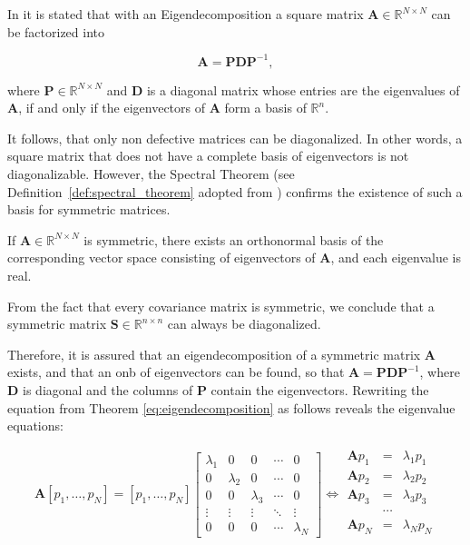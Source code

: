 \documentclass[../../../main.tex]{subfiles}
\begin{document}
In \cite[99]{dei_2020} it is stated that with an Eigendecomposition a square matrix $\bm{A} \in \mathbb{R}^{N \times N}$ can be factorized into

\begin{equation}\label{eq:eigendecomposition}
    \bm{A} = \bm{P}\bm{D}\bm{P}^{-1},
\end{equation}

where $\bm{P} \in \mathbb{R}^{N \times N}$ and $\bm{D}$ is a diagonal matrix whose entries are the eigenvalues of $\bm{A}$, if and only if the eigenvectors of $\bm{A}$ form a basis of $\mathbb{R}^n$.

It follows, that only non defective matrices can be diagonalized. In other words, a square matrix that does not have a complete basis of eigenvectors is not diagonalizable. However, the Spectral Theorem (see Definition~\ref{def:spectral_theorem} adopted from \cite[94]{dei_2020}) confirms the existence of such a basis for symmetric matrices.

\begin{definition}\label{def:spectral_theorem}
If $\bm{A} \in \mathbb{R}^{N \times N}$ is symmetric, there exists an orthonormal basis of the corresponding vector space consisting of eigenvectors of $\bm{A}$, and each eigenvalue is real.
\end{definition}

From the fact that every covariance matrix is symmetric, we conclude that a symmetric matrix $\bm{S} \in \mathbb{R}^{n \times n}$ can always be diagonalized.

Therefore, it is assured that an eigendecomposition of a symmetric matrix $\bm{A}$ exists, and that an \acrshort{onb} of eigenvectors can be found, so that $\bm{A} = \bm{P}\bm{D}\bm{P}^{-1}$, where $\bm{D}$ is diagonal and the columns of $\bm{P}$ contain the eigenvectors. Rewriting the equation from Theorem \ref{eq:eigendecomposition} as follows reveals the eigenvalue equations:

\begin{equation*}
        \bm{A} [p_1, \dots, p_N] = [p_1, \dots, p_N] \left[\begin{array}{ccccc}
            \lambda_1 & 0 & 0 & \cdots & 0 \\
            0 & \lambda_2 & 0 & \cdots & 0 \\
            0 & 0 & \lambda_3 & \cdots & 0 \\
            \vdots & \vdots & \vdots & \ddots & \vdots \\
            0 & 0 & 0 & \cdots & \lambda_N
        \end{array}\right] \Longleftrightarrow \begin{array}{ccc} 
            \bm{A}p_1 &= &\lambda_1p_1\\
            \bm{A}p_2 &= &\lambda_2p_2\\
            \bm{A}p_3 &= &\lambda_3p_3\\
            & \cdots& \\
            \bm{A}p_N &= &\lambda_Np_N\\
        \end{array}
\end{equation*}
\end{document}
